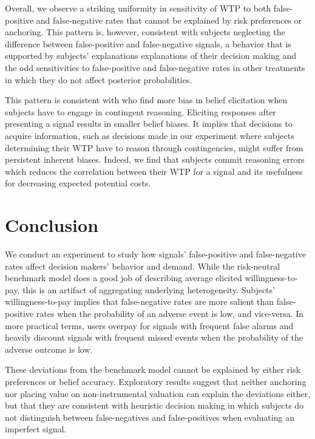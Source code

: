 \documentclass[12pt,a4paper]{article}
\begin{document}
Overall, we observe a striking uniformity in sensitivity of WTP to both false-positive and false-negative rates that cannot be explained by risk preferences or anchoring. This pattern is, however, consistent with subjects neglecting the difference between false-positive and false-negative signals, a behavior that is supported by subjects' explanations explanations of their decision making and the odd sensitivities to false-positive and false-negative rates in other treatments in which they do not affect posterior probabilities. 

This pattern is consistent with \citet{aina_contingent_2023} who find more bias in belief elicitation when subjects have to engage in contingent reasoning. Eliciting responses after presenting a signal results in smaller belief biases.  It implies that decisions to acquire information, such as decisions made in our experiment where subjects determining their WTP have to reason through contingencies, might suffer from persistent inherent biases. Indeed, we find that subjects commit reasoning errors which reduces the correlation between their WTP for a signal and its usefulness for decreasing expected potential costs. 

\vspace{10pt}
\section{Conclusion}\label{sec:conclusion}

We conduct an experiment to study how signals' false-positive and false-negative rates affect decision makers' behavior and demand.  While the risk-neutral benchmark model does a good job of describing average elicited willingness-to-pay, this is an artifact of aggregating underlying heterogeneity.  Subjects' willingness-to-pay implies that false-negative rates are more salient than false-positive rates when the probability of an adverse event is low, and vice-versa. In more practical terms, users overpay for signals with frequent false alarms and heavily discount signals with frequent missed events when the probability of the adverse outcome is low. 

These deviations from the benchmark model cannot be explained by either risk preferences or belief accuracy. Exploratory results suggest that neither anchoring nor placing value on non-instrumental valuation can explain the deviations either, but that they are consistent with heuristic decision making in which subjects do not distinguish between false-negatives and false-positives when evaluating an imperfect signal.       
\end{document}
